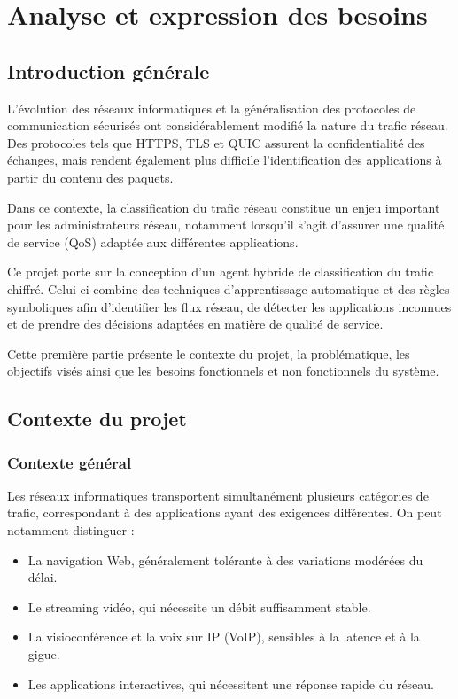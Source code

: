 
\chapter{Analyse et expression des besoins}

\section{Introduction générale}

L'évolution des réseaux informatiques et la généralisation des protocoles
de communication sécurisés ont considérablement modifié la nature du
trafic réseau. Des protocoles tels que HTTPS, TLS et QUIC assurent la
confidentialité des échanges, mais rendent également plus difficile
l'identification des applications à partir du contenu des paquets.

Dans ce contexte, la classification du trafic réseau constitue un enjeu
important pour les administrateurs réseau, notamment lorsqu'il s'agit
d'assurer une qualité de service (QoS) adaptée aux différentes
applications.

Ce projet porte sur la conception d'un agent hybride de classification
du trafic chiffré. Celui-ci combine des techniques d'apprentissage
automatique et des règles symboliques afin d'identifier les flux réseau,
de détecter les applications inconnues et de prendre des décisions
adaptées en matière de qualité de service.

Cette première partie présente le contexte du projet, la problématique,
les objectifs visés ainsi que les besoins fonctionnels et non
fonctionnels du système.

\section{Contexte du projet}

\subsection{Contexte général}

Les réseaux informatiques transportent simultanément plusieurs catégories
de trafic, correspondant à des applications ayant des exigences
différentes. On peut notamment distinguer :

\begin{itemize}
    \item La navigation Web, généralement tolérante à des variations
    modérées du délai.
    \item Le streaming vidéo, qui nécessite un débit suffisamment stable.
    \item La visioconférence et la voix sur IP (VoIP), sensibles à la
    latence et à la gigue.
    \item Les applications interactives, qui nécessitent une réponse
    rapide du réseau.
\end{itemize}

